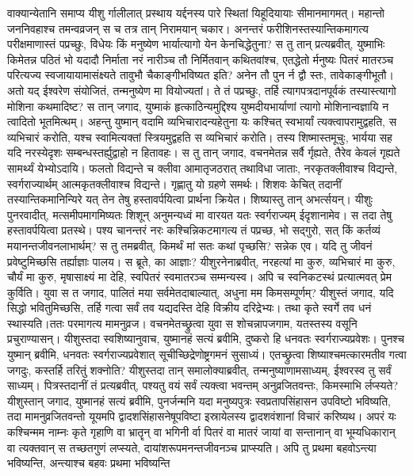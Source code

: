 \adhyAya
{}
\vakya वाक्यान्येतानि समाप्य यीशु र्गालीलात् प्रस्थाय यर्द्दनस्य पारे स्थितां यिहूदियायाः सीमानमागमत्।
\vakya महान्तो जननिवहाश्च तमन्वव्रजन् स च तत्र तान् निरामयान् चकार।
\vakya अनन्तरं फरीशिनस्तस्यान्तिकमागत्य परीक्षमाणास्तं पप्रच्छुः, विधेयः किं मनुष्येण भार्यात्यागो येन केनचिद्धेतुना?
\vakya स तु तान् प्रत्यब्रवीत्, युष्माभिः किमेतन्न पठितं भो यदादौ निर्माता नरं नारीञ्च तौ निर्मितवान् कथितवांश्च,
\vakya एतद्धेतो र्मनुष्यः पितरं मातरञ्च परित्यज्य स्वजायायामासंक्ष्यते तावुभौ चैकाङ्गीभविष्यत इति?
\vakya अनेन तौ पुन र्न द्वौ स्तः, तावेकाङ्गीभूतौ। अतो यद् ईश्वरेण संयोजितं, तन्मनुष्येण मा वियोज्यतां।
\vakya ते तं पप्रच्छुः, तर्हि त्यागपत्रदानपूर्वकं तस्यास्त्यागो मोशिना कथमादिष्ट?
\vakya स तान् जगाद, युष्माकं हृत्काठिन्यमुद्दिश्य युष्मदीयभार्याणां त्यागो मोशिनान्वज्ञायि न त्वादितो भूतमित्थम्।
\vakya अहन्तु युष्मान् वदामि व्यभिचारादन्यहेतुना यः कश्चित् स्वभार्यां त्यक्त्वापरामुद्वहति, स व्यभिचारं करोति, यश्च स्वामित्यक्तां स्त्रियमुद्वहति स व्यभिचारं करोति।
\vakya तस्य शिष्मास्तमूचुः, भार्यया सह यदि नरस्येदृशः सम्बन्धस्तर्ह्युद्वाहो न हितावहः।
\vakya स तु तान् जगाद, वचनमेतन्न सर्वै र्गृह्यते, तैरेव केवलं गृह्यते सामर्थ्यं येभ्योऽदायि।
\vakya फलतो विद्यन्ते च क्लीवा आमातृजठरात् तथाविधा जाताः, नरकृतक्लीवाश्च विद्यन्ते, स्वर्गराज्यार्थम् आत्मकृतक्लीवाश्च विद्यन्ते। गृह्णातु यो ग्रहणे समर्थः।
\vakya शिशवः केचित् तदानीं तस्यान्तिकमानिन्यिरे यत् तेन तेषु हस्तावर्पयित्वा प्रार्थना क्रियेत। शिष्यास्तु तान् अभर्त्सयन्।
\vakya यीशुः पुनरवादीत्, मत्समीपमागमिष्यतः शिशून् अनुमन्यध्वं मा वारयत यतः स्वर्गराज्यम् ईदृशानामेव। 
\vakya स तदा तेषु हस्तावर्पयित्वा प्रतस्थे।
\vakya पश्य चानन्तरं नरः कश्चिन्निकटमागत्य तं पप्रच्छ, भो सद्गुरो, सत् किं कर्तव्यं मयानन्तजीवनलाभार्थम्?
\vakya स तु तमब्रवीत्, किमर्थं मां सतः कथां पृच्छसि? सन्नेक एव। यदि तु जीवनं प्रवेष्टुमिच्छसि तर्ह्याज्ञाः पालय।
\vakya स ब्रूते, का आज्ञाः? यीशुरनेनाब्रवीत्, नरहत्यां मा कुरु, व्यभिचारं मा कुरु, चौर्यं मा कुरु, मृषासाक्ष्यं मा देहि, स्वपितरं स्वमातरञ्च सम्मन्यस्व।
\vakya अपि च स्वनिकटस्थं प्रत्यात्मवत् प्रेम कुर्विति।
\vakya युवा स त जगाद, पालितं मया सर्वमेतदाबाल्यात्, अधुना मम किमसम्पूर्णम्?
\vakya यीशुस्तं जगाद, यदि सिद्धो भवितुमिच्छसि, तर्हि गत्वा सर्वं तव यद्यदस्ति देहि विक्रीय दरिद्रेभ्यः। तथा कृते स्वर्गे तव धनं स्थास्यति।ततः परमागत्य मामनुव्रज।
\vakya वचनमेतच्छ्रुत्वा युवा स शोचन्नापजगाम, यतस्तस्य वसूनि प्रचुराण्यासन्।
\vakya यीशुस्तदा स्वशिष्यानुवाच, युष्मानहं सत्यं ब्रवीमि, दुष्करो हि धनवतः स्वर्गराज्यप्रवेशः।
\vakya पुनश्च युष्मान् ब्रवीमि, धनवतः स्वर्गराज्यप्रवेशात् सूचीच्छिद्रेणोष्ट्रगमनं सुसाध्यं।
\vakya एतच्छ्रुत्वा शिष्याश्चमत्कारमतीव गत्वा जगदुः, कस्तर्हि तरितुं शक्नोति?
\vakya यीशुस्तदा तान् समालोक्याब्रवीत्, तन्मनुष्याणामसाध्यम्, ईश्वरस्व तु सर्वं साध्यम्।
\vakya पित्रस्तदानीं तं प्रत्यब्रवीत्, पश्यतु वयं सर्वं त्यक्त्वा भवन्तम् अनुव्रजितवन्तः, किमस्माभि र्लप्स्यते?
\vakya यीशुस्तान् जगाद, युष्मानहं सत्यं ब्रवीमि, पुनर्जन्मनि यदा मनुष्यपुत्रः स्वप्रतापसिंहासन उपविष्टो भविष्यति, तदा मामनुव्रजितवन्तो यूयमपि द्वादशसिंहासनेषूपविष्टा इस्रायेलस्य द्वादशवंशानां विचारं करिष्यथ।
\vakya अपरं यः कश्चिन्मम नाम्नः कृते गृहाणि वा भ्रातॄन् वा भगिनी र्वा पितरं वा मातरं जायां वा सन्तानान् वा भूम्यधिकारान् वा त्यक्तवान् स तच्छतगुणं लप्स्यते, दायांशरूपमनन्तजीवनञ्च प्राप्स्यति।
\vakya अपि तु प्रथमा बहवोऽन्त्या भविष्यन्ति, अन्त्याश्च बहवः प्रथमा भविष्यन्ति\eoc